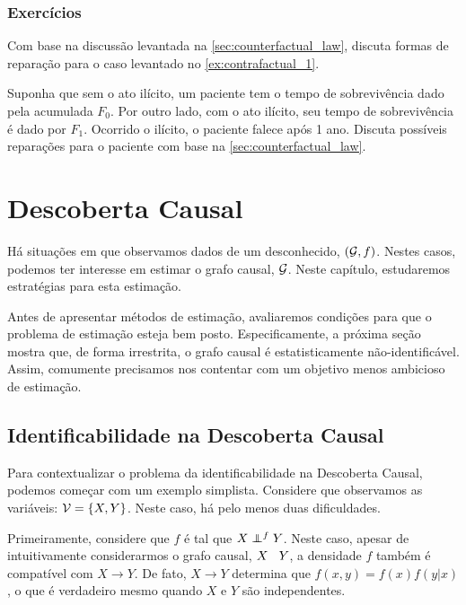 \subsection{Exercícios}

\begin{exercise}
 Com base na discussão levantada na \cref{sec:counterfactual_law},
 discuta formas de reparação para
 o caso levantado no \cref{ex:contrafactual_1}.
\end{exercise}

\begin{exercise}
 Suponha que sem o ato ilícito,
 um paciente tem o tempo de sobrevivência dado
 pela acumulada $F_0$.
 Por outro lado, com o ato ilícito,
 seu tempo de sobrevivência é dado por $F_1$.
 Ocorrido o ilícito, o paciente falece após 1 ano.
 Discuta possíveis reparações para
 o paciente com base na \cref{sec:counterfactual_law}.
\end{exercise}

\chapter{Descoberta Causal}
\label{sec:discovery}

Há situações em que observamos dados de
um \CM desconhecido, $({\mathcal G}, f)$.
Nestes casos, podemos ter interesse em
estimar o grafo causal, ${\mathcal G}$.
Neste capítulo, estudaremos estratégias 
para esta estimação.

Antes de apresentar métodos de estimação,
avaliaremos condições para que 
o problema de estimação esteja bem posto.
Especificamente, a próxima seção mostra que,
de forma irrestrita, o grafo causal é 
estatisticamente não-identificável.
Assim, comumente precisamos nos contentar com
um objetivo menos ambicioso de estimação.

\section{Identificabilidade na Descoberta Causal}
\label{sec:discovery_id}

Para contextualizar o problema da
identificabilidade na Descoberta Causal,
podemos começar com um exemplo simplista.
Considere que observamos as variáveis: ${\mathcal V} = \{X, Y\}$.
Neste caso, há pelo menos duas dificuldades.

Primeiramente, considere que 
$f$ é tal que $X \perp\!\!\!\!\perp^f Y$.
Neste caso, apesar de intuitivamente 
considerarmos o grafo causal,
$X \hspace{3 mm} Y$, 
a densidade $f$ também é compatível com
$X \rightarrow Y$.
De fato, $X \rightarrow Y$ determina que
$f(x, y) = f(x)f(y|x)$, 
o que é verdadeiro mesmo quando 
$X$ e $Y$ são independentes.

